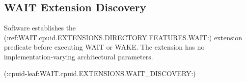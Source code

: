 \subsection{WAIT Extension Discovery}\label{section:wait-extension-discovery}
Software establishes the (:ref:WAIT.cpuid.EXTENSIONS.DIRECTORY.FEATURES.WAIT:) extension predicate before executing WAIT or WAKE. The extension has no
implementation-varying architectural parameters.

(:cpuid-leaf:WAIT.cpuid.EXTENSIONS.WAIT_DISCOVERY:)
